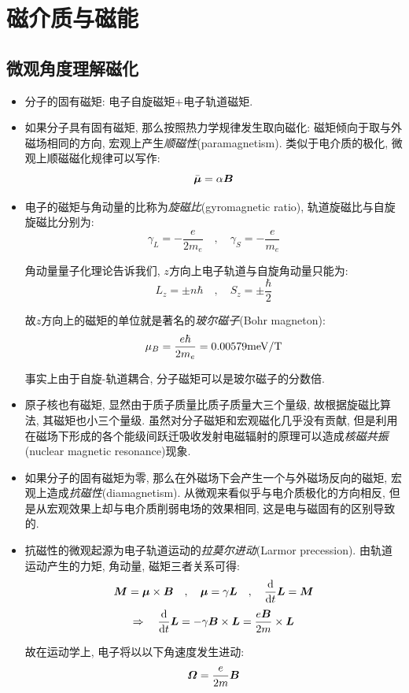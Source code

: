 \section{磁介质与磁能}

\subsection{微观角度理解磁化}

\begin{itemize}
\item 分子的固有磁矩: 电子自旋磁矩+电子轨道磁矩.
\item 如果分子具有固有磁矩, 那么按照热力学规律发生取向磁化: 磁矩倾向于取与外磁场相同的方向, 宏观上产生\emph{顺磁性}(paramagnetism). 类似于电介质的极化, 微观上顺磁磁化规律可以写作:
\[\bar{\boldsymbol{\mu}}=\alpha \boldsymbol{B}\]
\item 电子的磁矩与角动量的比称为\emph{旋磁比}(gyromagnetic ratio), 轨道旋磁比与自旋旋磁比分别为:
\[\gamma_L=-\frac{e}{2m_e}\quad ,\quad \gamma_S=-\frac{e}{m_e}\]

角动量量子化理论告诉我们, $z$方向上电子轨道与自旋角动量只能为:
\[L_z=\pm n\hbar \quad ,\quad  S_z=\pm \frac{\hbar}{2}\]

故$z$方向上的磁矩的单位就是著名的\emph{玻尔磁子}(Bohr magneton):
\[\mu_B=\frac{e\hbar}{2m_e}=0.00579{\rm meV/T}\]

事实上由于自旋-轨道耦合, 分子磁矩可以是玻尔磁子的分数倍.

\item 原子核也有磁矩, 显然由于质子质量比质子质量大三个量级, 故根据旋磁比算法, 其磁矩也小三个量级. 虽然对分子磁矩和宏观磁化几乎没有贡献, 但是利用在磁场下形成的各个能级间跃迁吸收发射电磁辐射的原理可以造成\emph{核磁共振}(nuclear magnetic resonance)现象.

\item 如果分子的固有磁矩为零, 那么在外磁场下会产生一个与外磁场反向的磁矩, 宏观上造成\emph{抗磁性}(diamagnetism). 从微观来看似乎与电介质极化的方向相反, 但是从宏观效果上却与电介质削弱电场的效果相同, 这是电与磁固有的区别导致的.

\item 抗磁性的微观起源为电子轨道运动的\emph{拉莫尔进动}(Larmor precession). 由轨道运动产生的力矩, 角动量, 磁矩三者关系可得:
\[\boldsymbol{M}=\boldsymbol{\mu}\times \boldsymbol{B}\quad ,\quad  \boldsymbol{\mu}=\gamma \boldsymbol{L}\quad ,\quad  \frac{\textrm{d}}{\textrm{d} t}\boldsymbol{L}=\boldsymbol{M}\]
\[\Rightarrow \quad  \frac{\textrm{d}}{\textrm{d} t}\boldsymbol{L}=-\gamma \boldsymbol{B}\times \boldsymbol{L}=\frac{e\boldsymbol{B}}{2m}\times \boldsymbol{L}\]

故在运动学上, 电子将以以下角速度发生进动:
\[\boldsymbol{\varOmega}=\frac{e}{2m}\boldsymbol{B}\]


\end{itemize}
